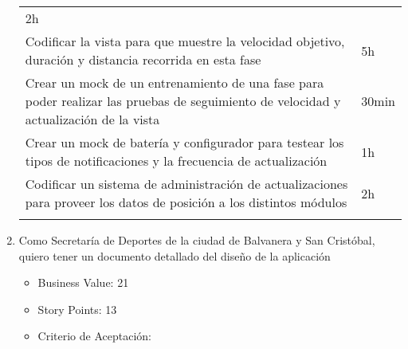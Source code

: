\begin{enumerate}
\begin{longtable}[c]{@{}ll@{}}
\begin{minipage}[t]{0.08\columnwidth}
  2h
  \end{minipage}
  \\\noalign{\medskip}
  \begin{minipage}[t]{0.92\columnwidth}\raggedright
  Codificar la vista para que muestre la velocidad objetivo, duración y
  distancia recorrida en esta fase
  \end{minipage} & \begin{minipage}[t]{0.08\columnwidth}\raggedright
  5h
  \end{minipage}
  \\\noalign{\medskip}
  \begin{minipage}[t]{0.92\columnwidth}\raggedright
  Crear un mock de un entrenamiento de una fase para poder realizar las
  pruebas de seguimiento de velocidad y actualización de la vista
  \end{minipage} & \begin{minipage}[t]{0.08\columnwidth}\raggedright
  30min
  \end{minipage}
  \\\noalign{\medskip}
  \begin{minipage}[t]{0.92\columnwidth}\raggedright
  Crear un mock de batería y configurador para testear los tipos de
  notificaciones y la frecuencia de actualización
  \end{minipage} & \begin{minipage}[t]{0.08\columnwidth}\raggedright
  1h
  \end{minipage}
  \\\noalign{\medskip}
  \begin{minipage}[t]{0.92\columnwidth}\raggedright
  Codificar un sistema de administración de actualizaciones para proveer
  los datos de posición a los distintos módulos
  \end{minipage} & \begin{minipage}[t]{0.08\columnwidth}\raggedright
  2h
  \end{minipage}
  \\\noalign{\medskip}
  \hline
  \end{longtable}
\item
  Como Secretaría de Deportes de la ciudad de Balvanera y San Cristóbal,
  quiero tener un documento detallado del diseño de la aplicación

  \begin{itemize}
  \itemsep1pt\parskip0pt
  \item
    Business Value: 21
  \item
    Story Points: 13
  \item
    Criterio de Aceptación:


\end{itemize}
\end{enumerate}
